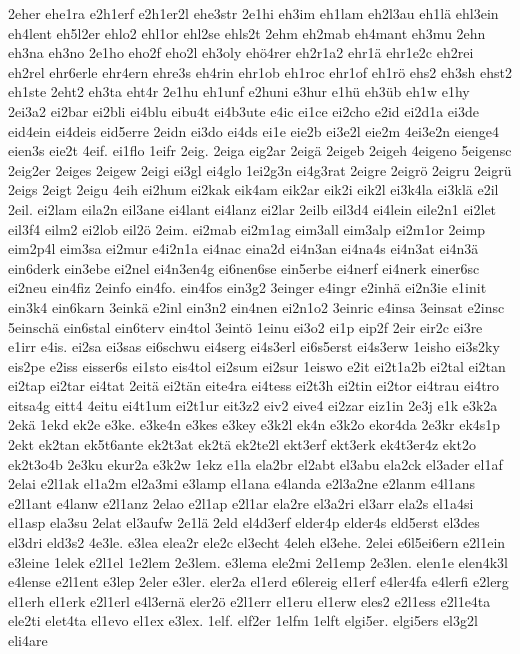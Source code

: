 {2eher
ehe1ra
e2h1erf
e2h1er2l
ehe3str
2e1hi
eh3im
eh1lam
eh2l3au
eh1lä
ehl3ein
eh4lent
eh5l2er
ehlo2
ehl1or
ehl2se
ehls2t
2ehm
eh2mab
eh4mant
eh3mu
2ehn
eh3na
eh3no
2e1ho
eho2f
eho2l
eh3oly
ehö4rer
eh2r1a2
ehr1ä
ehr1e2c
eh2rei
eh2rel
ehr6erle
ehr4ern
ehre3s
eh4rin
ehr1ob
eh1roc
ehr1of
eh1rö
ehs2
eh3sh
ehst2
eh1ste
2eht2
eh3ta
eht4r
2e1hu
eh1unf
e2huni
e3hur
e1hü
eh3üb
eh1w
e1hy
2ei3a2
ei2bar
ei2bli
ei4blu
eibu4t
ei4b3ute
e4ic
ei1ce
ei2cho
e2id
ei2d1a
ei3de
eid4ein
ei4deis
eid5erre
2eidn
ei3do
ei4ds
ei1e
eie2b
ei3e2l
eie2m
4ei3e2n
eienge4
eien3s
eie2t
4eif.
ei1flo
1eifr
2eig.
2eiga
eig2ar
2eigä
2eigeb
2eigeh
4eigeno
5eigensc
2eig2er
2eiges
2eigew
2eigi
ei3gl
ei4glo
1ei2g3n
ei4g3rat
2eigre
2eigrö
2eigru
2eigrü
2eigs
2eigt
2eigu
4eih
ei2hum
ei2kak
eik4am
eik2ar
eik2i
eik2l
ei3k4la
ei3klä
e2il
2eil.
ei2lam
eila2n
eil3ane
ei4lant
ei4lanz
ei2lar
2eilb
eil3d4
ei4lein
eile2n1
ei2let
eil3f4
eilm2
ei2lob
eil2ö
2eim.
ei2mab
ei2m1ag
eim3all
eim3alp
ei2m1or
2eimp
eim2p4l
eim3sa
ei2mur
e4i2n1a
ei4nac
eina2d
ei4n3an
ei4na4s
ei4n3at
ei4n3ä
ein6derk
ein3ebe
ei2nel
ei4n3en4g
ei6nen6se
ein5erbe
ei4nerf
ei4nerk
einer6sc
ei2neu
ein4fiz
2einfo
ein4fo.
ein4fos
ein3g2
3einger
e4ingr
e2inhä
ei2n3ie
e1init
ein3k4
ein6karn
3einkä
e2inl
ein3n2
ein4nen
ei2n1o2
3einric
e4insa
3einsat
e2insc
5einschä
ein6stal
ein6terv
ein4tol
3eintö
1einu
ei3o2
ei1p
eip2f
2eir
eir2c
ei3re
e1irr
e4is.
ei2sa
ei3sas
ei6schwu
ei4serg
ei4s3erl
ei6s5erst
ei4s3erw
1eisho
ei3s2ky
eis2pe
e2iss
eisser6s
ei1sto
eis4tol
ei2sum
ei2sur
1eiswo
e2it
ei2t1a2b
ei2tal
ei2tan
ei2tap
ei2tar
ei4tat
2eitä
ei2tän
eite4ra
ei4tess
ei2t3h
ei2tin
ei2tor
ei4trau
ei4tro
eitsa4g
eitt4
4eitu
ei4t1um
ei2t1ur
eit3z2
eiv2
eive4
ei2zar
eiz1in
2e3j
e1k
e3k2a
2ekä
1ekd
ek2e
e3ke.
e3ke4n
e3kes
e3key
e3k2l
ek4n
e3k2o
ekor4da
2e3kr
ek4s1p
2ekt
ek2tan
ek5t6ante
ek2t3at
ek2tä
ek2te2l
ekt3erf
ekt3erk
ek4t3er4z
ekt2o
ek2t3o4b
2e3ku
ekur2a
e3k2w
1ekz
e1la
ela2br
el2abt
el3abu
ela2ck
el3ader
el1af
2elai
e2l1ak
el1a2m
el2a3mi
e3lamp
el1ana
e4landa
e2l3a2ne
e2lanm
e4l1ans
e2l1ant
e4lanw
e2l1anz
2elao
e2l1ap
e2l1ar
ela2re
el3a2ri
el3arr
ela2s
el1a4si
el1asp
ela3su
2elat
el3aufw
2e1lä
2eld
el4d3erf
elder4p
elder4s
eld5erst
el3des
el3dri
eld3s2
4e3le.
e3lea
elea2r
ele2c
el3echt
4eleh
el3ehe.
2elei
e6l5ei6ern
e2l1ein
e3leine
1elek
e2l1el
1e2lem
2e3lem.
e3lema
ele2mi
2el1emp
2e3len.
elen1e
elen4k3l
e4lense
e2l1ent
e3lep
2eler
e3ler.
eler2a
el1erd
e6lereig
el1erf
e4ler4fa
e4lerfi
e2lerg
el1erh
el1erk
e2l1erl
e4l3ernä
eler2ö
e2l1err
el1eru
el1erw
eles2
e2l1ess
e2l1e4ta
ele2ti
elet4ta
el1evo
el1ex
e3lex.
1elf.
elf2er
1elfm
1elft
elgi5er.
elgi5ers
el3g2l
eli4are
}
